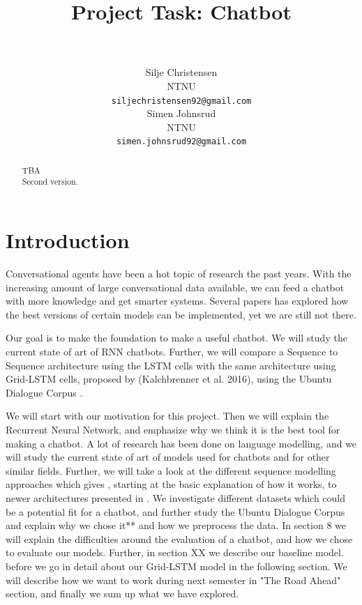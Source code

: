\documentclass{article} %
\title{Project Task: Chatbot}
\author{
 \\
\texttt{} \\
\AND
Silje Christensen \\
NTNU \\
\texttt{siljechristensen92@gmail.com} \\
\And
Simen Johnsrud \\
NTNU \\
\texttt{simen.johnsrud92@gmail.com} \\
}
\begin{document}
\maketitle

\begin{abstract}
TBA\\
Second version.
\end{abstract}

\section{Introduction}
Conversational agents have been a hot topic of research the past years. With the increasing amount of large conversational data available, we can feed a chatbot with more knowledge and get smarter systems. Several papers has explored how the best versions of certain models can be implemented, yet we are still not there.

Our goal is to make the foundation to make a useful chatbot. We will study the current state of art of RNN chatbots. Further, we will compare a Sequence to Sequence architecture using the LSTM cells with the same architecture using Grid-LSTM cells, proposed by (Kalchbrenner et al. 2016), using the Ubuntu Dialogue Corpus \cite{Ubuntuv2}. 

We will start with our motivation for this project. Then we will explain the Recurrent Neural Network, and emphasize why we think it is the best tool for making a chatbot. A lot of research has been done on language modelling, and we will study the current state of art of models used for chatbots and for other similar fields. Further, we will take a look at the different sequence modelling approaches which gives , starting at the basic explanation of how it works, to newer architectures presented in \cite{Kalchbrenner}. We investigate different datasets which could be a potential fit for a chatbot, and further study the Ubuntu Dialogue Corpus \cite{Ubuntuv2} and explain why we chose it** and how we preprocess the data. In section 8 we will explain the difficulties around the evaluation of a chatbot, and how we chose to evaluate our models. Further, in section XX we describe our baseline model. before we go in detail about our Grid-LSTM model in the following section. We will describe how we want to work during next semester in "The Road Ahead" section, and finally we sum up what we have explored. 

\end{document}
